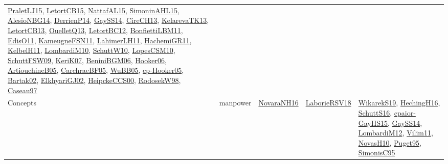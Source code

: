 {\begin{longtable}{llp{6cm}p{6cm}p{6cm}}
\href{papers/PraletLJ15.pdf}{PraletLJ15}\cite{PraletLJ15}, \href{articles/LetortCB15.pdf}{LetortCB15}\cite{LetortCB15}, \href{articles/NattafAL15.pdf}{NattafAL15}\cite{NattafAL15}, \href{articles/SimoninAHL15.pdf}{SimoninAHL15}\cite{SimoninAHL15}, \href{papers/AlesioNBG14.pdf}{AlesioNBG14}\cite{AlesioNBG14}, \href{papers/DerrienP14.pdf}{DerrienP14}\cite{DerrienP14}, \href{papers/GaySS14.pdf}{GaySS14}\cite{GaySS14}, \href{papers/CireCH13.pdf}{CireCH13}\cite{CireCH13}, \href{papers/KelarevaTK13.pdf}{KelarevaTK13}\cite{KelarevaTK13}, \href{papers/LetortCB13.pdf}{LetortCB13}\cite{LetortCB13}, \href{papers/OuelletQ13.pdf}{OuelletQ13}\cite{OuelletQ13}, \href{papers/LetortBC12.pdf}{LetortBC12}\cite{LetortBC12}, \href{papers/BonfiettiLBM11.pdf}{BonfiettiLBM11}\cite{BonfiettiLBM11}, \href{papers/EdisO11.pdf}{EdisO11}\cite{EdisO11}, \href{papers/KameugneFSN11.pdf}{KameugneFSN11}\cite{KameugneFSN11}, \href{papers/LahimerLH11.pdf}{LahimerLH11}\cite{LahimerLH11}, \href{articles/HachemiGR11.pdf}{HachemiGR11}\cite{HachemiGR11}, \href{articles/KelbelH11.pdf}{KelbelH11}\cite{KelbelH11}, \href{papers/LombardiM10.pdf}{LombardiM10}\cite{LombardiM10}, \href{papers/SchuttW10.pdf}{SchuttW10}\cite{SchuttW10}, \href{articles/LopesCSM10.pdf}{LopesCSM10}\cite{LopesCSM10}, \href{papers/SchuttFSW09.pdf}{SchuttFSW09}\cite{SchuttFSW09}, \href{papers/KeriK07.pdf}{KeriK07}\cite{KeriK07}, \href{papers/BeniniBGM06.pdf}{BeniniBGM06}\cite{BeniniBGM06}, \href{articles/Hooker06.pdf}{Hooker06}\cite{Hooker06}, \href{papers/ArtiouchineB05.pdf}{ArtiouchineB05}\cite{ArtiouchineB05}, \href{papers/CarchraeBF05.pdf}{CarchraeBF05}\cite{CarchraeBF05}, \href{papers/WuBB05.pdf}{WuBB05}\cite{WuBB05}, \href{papers/cp-Hooker05.pdf}{cp-Hooker05}\cite{cp-Hooker05}, \href{papers/Bartak02.pdf}{Bartak02}\cite{Bartak02}, \href{papers/ElkhyariGJ02.pdf}{ElkhyariGJ02}\cite{ElkhyariGJ02}, \href{articles/HeipckeCCS00.pdf}{HeipckeCCS00}\cite{HeipckeCCS00}, \href{papers/RodosekW98.pdf}{RodosekW98}\cite{RodosekW98}, \href{papers/Caseau97.pdf}{Caseau97}\cite{Caseau97}\\
Concepts & manpower & \href{articles/NovaraNH16.pdf}{NovaraNH16}\cite{NovaraNH16} & \href{articles/LaborieRSV18.pdf}{LaborieRSV18}\cite{LaborieRSV18} & \href{articles/WikarekS19.pdf}{WikarekS19}\cite{WikarekS19}, \href{papers/HechingH16.pdf}{HechingH16}\cite{HechingH16}, \href{papers/SchuttS16.pdf}{SchuttS16}\cite{SchuttS16}, \href{papers/cpaior-GayHS15.pdf}{cpaior-GayHS15}\cite{cpaior-GayHS15}, \href{papers/GaySS14.pdf}{GaySS14}\cite{GaySS14}, \href{articles/LombardiM12.pdf}{LombardiM12}\cite{LombardiM12}, \href{papers/Vilim11.pdf}{Vilim11}\cite{Vilim11}, \href{articles/NovasH10.pdf}{NovasH10}\cite{NovasH10}, \href{papers/Puget95.pdf}{Puget95}\cite{Puget95}, \href{papers/SimonisC95.pdf}{SimonisC95}\cite{SimonisC95}\\

\end{longtable}}
